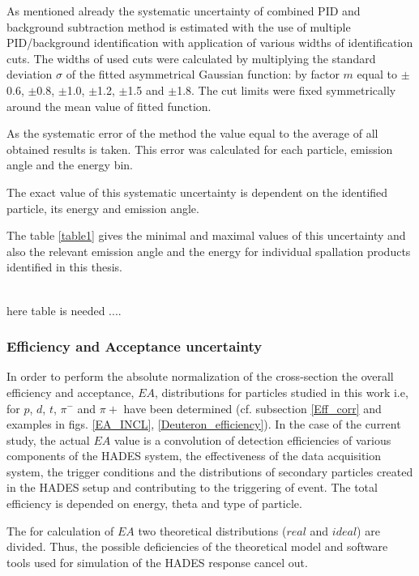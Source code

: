 As mentioned already the systematic uncertainty of combined PID 
and background subtraction method is estimated with 
the use of multiple PID/background identification 
with application of various widths of identification cuts.  
The widths of used cuts were calculated by multiplying 
the standard deviation $\sigma$ of the fitted asymmetrical Gaussian function:
by factor $m$ equal to $\pm$0.6, $\pm$0.8, $\pm$1.0, $\pm$1.2, $\pm$1.5 and $\pm$1.8. 
The cut limits were fixed symmetrically around the mean value of fitted function.

As the systematic error of the method the value equal to the average of all obtained results is taken.
This error was calculated for each particle, emission angle and the energy bin. 

The exact value of this systematic uncertainty is dependent on the identified particle, its energy and emission angle.

The table \ref{table1} gives the minimal and maximal values of this uncertainty 
and also the relevant emission angle and the energy for individual spallation products 
identified in this thesis.

\ \\

here table \label{table1} is needed .... \\


\subsubsection{Efficiency and Acceptance uncertainty}

In order to perform the absolute normalization of the cross-section the overall efficiency and acceptance,  $EA$, distributions for  particles studied in this work i.e, for $p$, $d$, $t$, $\pi^-$ and $\pi+$ have been determined (cf. subsection
\ref{Eff_corr} and examples in figs. \ref{EA_INCL}, \ref{Deuteron_efficiency}). In the case of the current study, the actual $EA$ value is a convolution of detection efficiencies of various components of the HADES system, the effectiveness of the data acquisition system, the trigger conditions and the distributions of secondary particles created in the HADES setup and contributing to the triggering of event. The total efficiency is depended on energy, theta and type of particle.

The for calculation of $EA$ two theoretical distributions ($real$ and $ideal$) are divided.  
Thus, the possible deficiencies of the theoretical 
model and software tools used for simulation of the HADES response cancel out.

